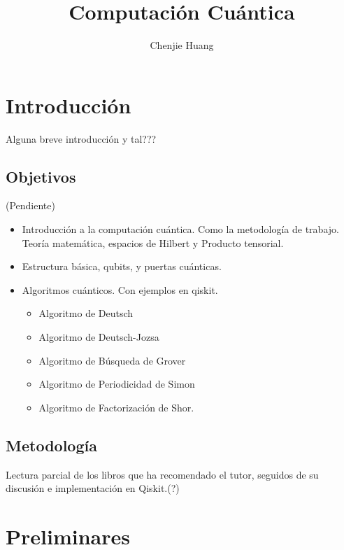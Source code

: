 \documentclass[a4paper]{article}
\title{Computación Cuántica}
\author{Chenjie Huang}
\date{}
\numberwithin{equation}{section}
\begin{document}
\maketitle

\tableofcontents

\newpage

\thispagestyle{empty}

\newpage

\section{Introducción}

Alguna breve introducción y tal???

\subsection{Objetivos}

(Pendiente)

\begin{itemize}
\item Introducción a la computación cuántica. Como la metodología de trabajo. Teoría matemática, espacios de Hilbert y Producto tensorial.

\item Estructura básica, qubits, y puertas cuánticas.

\item Algoritmos cuánticos. Con ejemplos en qiskit.

\begin{itemize}
	\item Algoritmo de Deutsch
	\item Algoritmo de Deutsch-Jozsa
	\item Algoritmo de Búsqueda de Grover
	\item Algoritmo de Periodicidad de Simon
	\item Algoritmo de Factorización de Shor.
\end{itemize}

\end{itemize}

\subsection{Metodología}
Lectura parcial de los libros que ha recomendado el tutor, seguidos de su discusión e implementación en Qiskit.(?)

\section{Preliminares}
\end{document}
